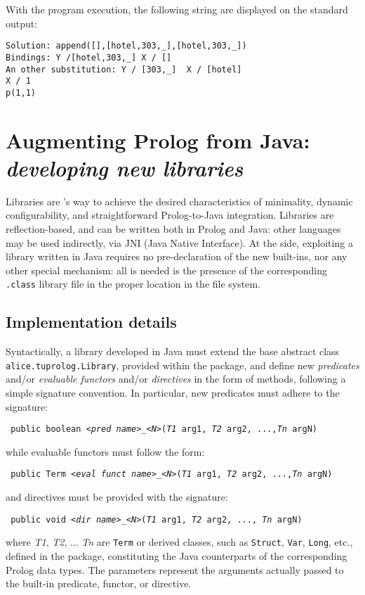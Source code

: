With the program execution, the following string are displayed on
the standard output:

{\tt\small{

\begin{verbatim}
Solution: append([],[hotel,303,_],[hotel,303,_])
Bindings: Y /[hotel,303,_] X / []
An other substitution: Y / [303,_]  X / [hotel]
X / 1
p(1,1)
\end{verbatim}}} 

\section{Augmenting Prolog from Java: \textit{developing new libraries}}
\label{sec:howto-develop-libraries}

Libraries are \tuprolog{}'s way to achieve the desired characteristics
of minimality, dynamic configurability, and straightforward
Prolog-to-Java integration.
%
Libraries are reflection-based, and can be written both in Prolog
and Java: other languages may be used indirectly, via JNI (Java
Native Interface).
%
At the \tuprolog{} side, exploiting a library written in Java
requires no pre-declaration of the new built-ins, nor any other
special mechanism: all is needed is the presence of the
corresponding \texttt{.class} library file in the proper location
in the file system.

\subsection{Implementation details}

Syntactically, a library developed in Java must extend the base
abstract class \texttt{alice.tuprolog.Library}, provided within
the \tuprolog{} package, and define new \textit{predicates} and/or
\textit{evaluable functors} and/or \textit{directives} in the form
of methods, following a simple signature convention.
%
In particular, new predicates must adhere to the signature:
%
\begin{center}
\small\tt
    public boolean <\textit{pred name}>\_<\textit{N}>(\textit{T1} arg1,
\textit{T2} arg2, ...,\textit{Tn} argN)
\end{center}
%
while evaluable functors must follow the form:
%
\begin{center}
    \small\tt
    public Term <\textit{eval funct name}>\_<\textit{N}>(\textit{T1} arg1,
\textit{T2} arg2, ...,\textit{Tn} argN)
\end{center}
%
and directives must be provided with the signature:
%
\begin{center}
    \small\tt
    public void <\textit{dir name}>\_<\textit{N}>(\textit{T1} arg1,
\textit{T2} arg2, ..., \textit{Tn} argN)
\end{center}
%
where \textit{T1}, \textit{T2}, ... \textit{Tn} are \texttt{Term} or derived
classes, such as \texttt{Struct}, \texttt{Var}, \texttt{Long}, etc., defined in
the \tuprolog{} package, constituting  the Java counterparts of
the corresponding Prolog data types.
%
The parameters represent the arguments actually passed to the built-in
predicate, functor, or directive.

